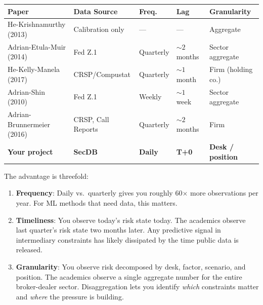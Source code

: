 \begin{center}
\begin{tabular}{p{3.5cm} p{2.5cm} p{2cm} p{2cm} p{3cm}}
\toprule
\textbf{Paper} & \textbf{Data Source} & \textbf{Freq.} & \textbf{Lag} & \textbf{Granularity} \\
\midrule
He-Krishnamurthy (2013) & Calibration only & --- & --- & Aggregate \\
Adrian-Etula-Muir (2014) & Fed Z.1 & Quarterly & ${\sim}2$ months & Sector aggregate \\
He-Kelly-Manela (2017) & CRSP/Compustat & Quarterly & ${\sim}1$ month & Firm (holding co.) \\
Adrian-Shin (2010) & Fed Z.1 & Weekly & ${\sim}1$ week & Sector aggregate \\
Adrian-Brunnermeier (2016) & CRSP, Call Reports & Quarterly & ${\sim}2$ months & Firm \\
\midrule
\textbf{Your project} & \textbf{SecDB} & \textbf{Daily} & \textbf{T+0} & \textbf{Desk / position} \\
\bottomrule
\end{tabular}
\end{center}

The advantage is threefold:

\begin{enumerate}[nosep]
  \item \textbf{Frequency}: Daily vs.\ quarterly gives you roughly 60$\times$ more observations per year. For ML methods that need data, this matters.
  \item \textbf{Timeliness}: You observe today's risk state today. The academics observe last quarter's risk state two months later. Any predictive signal in intermediary constraints has likely dissipated by the time public data is released.
  \item \textbf{Granularity}: You observe risk decomposed by desk, factor, scenario, and position. The academics observe a single aggregate number for the entire broker-dealer sector. Disaggregation lets you identify \emph{which} constraints matter and \emph{where} the pressure is building.
\end{enumerate}

